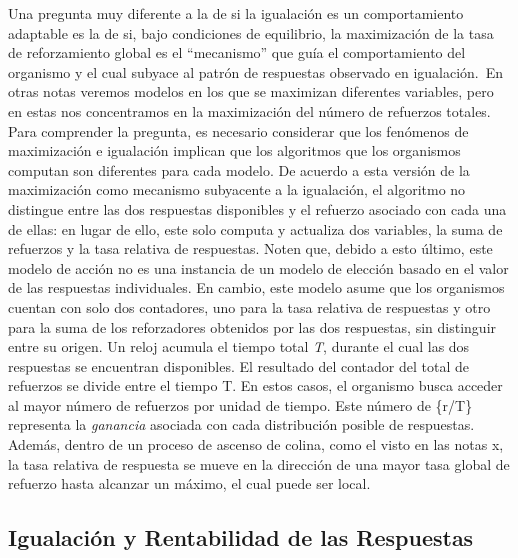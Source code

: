 \documentclass[
  a4paper,
  DIV=11,
  numbers=noendperiod]{scrreprt}
\begin{document}
Una pregunta muy diferente a la de si la igualación es un comportamiento
adaptable es la de si, bajo condiciones de equilibrio, la maximización
de la tasa de reforzamiento global es el ``mecanismo'' que guía el
comportamiento del organismo y el cual subyace al patrón de respuestas
observado en igualación.~En otras notas veremos modelos en los que se
maximizan diferentes variables, pero en estas nos concentramos en la
maximización del número de refuerzos totales. Para comprender la
pregunta, es necesario considerar que los fenómenos de maximización e
igualación implican que los algoritmos que los organismos computan son
diferentes para cada modelo. De acuerdo a esta versión de la
maximización como mecanismo subyacente a la igualación, el algoritmo no
distingue entre las dos respuestas disponibles y el refuerzo asociado
con cada una de ellas: en lugar de ello, este solo computa y actualiza
dos variables, la suma de refuerzos y la tasa relativa de respuestas.
Noten que, debido a esto último, este modelo de acción no es una
instancia de un modelo de elección basado en el valor de las respuestas
individuales. En cambio, este modelo asume que los organismos cuentan
con solo dos contadores, uno para la tasa relativa de respuestas y otro
para la suma de los reforzadores obtenidos por las dos respuestas, sin
distinguir entre su origen. Un reloj acumula el tiempo total \emph{T},
durante el cual las dos respuestas se encuentran disponibles. El
resultado del contador del total de refuerzos se divide entre el tiempo
T. En estos casos, el organismo busca acceder al mayor número de
refuerzos por unidad de tiempo. Este número de \{r/T\} representa la
\emph{ganancia} asociada con cada distribución posible de respuestas.
Además, dentro de un proceso de ascenso de colina, como el visto en las
notas x, la tasa relativa de respuesta se mueve en la dirección de una
mayor tasa global de refuerzo hasta alcanzar un máximo, el cual puede
ser local.

\subsection{Igualación y Rentabilidad de las
Respuestas}\label{igualaciuxf3n-y-rentabilidad-de-las-respuestas}
\end{document}
